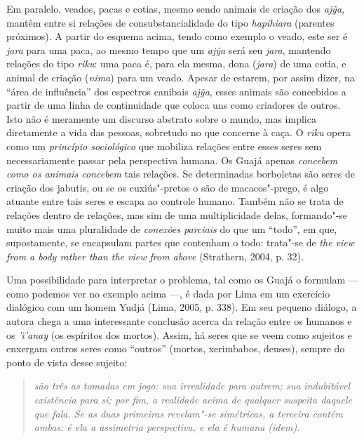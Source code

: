 Em paralelo, veados, pacas e cotias, mesmo sendo animais de criação dos
\emph{ajỹa,} mantêm entre si relações de consubstancialidade do tipo
\emph{hapihiara} (parentes próximos). A partir do esquema acima, tendo
como exemplo o veado, este ser é \emph{jara} para uma paca, ao mesmo
tempo que um \emph{ajỹa} será seu \emph{jara}, mantendo relações do tipo
\emph{riku}: uma paca é, para ela mesma, dona (\emph{jara}) de uma
cotia, e animal de criação (\emph{nima}) para um veado. Apesar de
estarem, por assim dizer, na ``área de influência'' dos espectros canibais
\emph{ajỹa}, esses animais são concebidos a partir de uma linha de
continuidade que coloca uns como criadores de outros. Isto não é
meramente um discurso abstrato sobre o mundo, mas implica diretamente a
vida das pessoas, sobretudo no que concerne à caça. O \emph{riku} opera
como um \emph{princípio sociológico} que mobiliza relações entre esses
seres sem necessariamente passar pela perspectiva humana. Os Guajá
apenas \emph{concebem} \emph{como os animais concebem} tais relações. Se
determinadas borboletas são seres de criação dos jabutis, ou se os
cuxiús"-pretos o são de macacos"-prego, é algo atuante entre tais seres e
escapa ao controle humano. Também não se trata de relações dentro de
relações, mas sim de uma multiplicidade delas, formando"-se muito mais
uma pluralidade de \emph{conexões parciais} do que um ``todo'', em que,
supostamente, se encapsulam partes que contenham o todo: trata"-se de
\emph{the view from a body rather than the view from above} (Strathern,
2004, p. 32)\emph{.}

Uma possibilidade para interpretar o problema, tal como os Guajá o
formulam --- como podemos ver no exemplo acima ---, é dada por Lima em um
exercício dialógico com um homem Yudjá (Lima, 2005, p. 338). Em seu pequeno
diálogo, a autora chega a uma interessante conclusão acerca da relação
entre os humanos e os \emph{'ï'anay} (os espíritos dos mortos). Assim,
há seres que se veem como sujeitos e enxergam outros seres como ``outros''
(mortos, xerimbabos, deuses), sempre do ponto de vista desse sujeito:

\begin{quote}
\emph{são três as tomadas em jogo: sua irrealidade para outrem; sua
indubitável existência para si; por fim, a realidade acima de qualquer
suspeita daquele que fala. Se as duas primeiras revelam"-se simétricas, a
terceira contém ambas: é ela a assimetria perspectiva, e ela é humana
(\emph{idem})}.
\end{quote}

